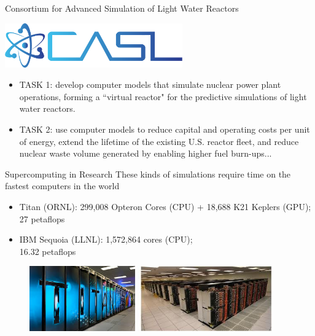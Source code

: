 \documentclass[xcolor=x11names,compress]{beamer}
\renewcommand{\(}{\begin{columns}}
\renewcommand{\)}{\end{columns}}
\newcommand{\<}[1]{\begin{column}{#1}}
\renewcommand{\>}{\end{column}}
\begin{document}
\begin{frame}{Consortium for Advanced Simulation of Light Water Reactors}
\begin{center}
\includegraphics[height=0.75in,clip]{CASL}
\end{center}
\begin{itemize}
\item \textcolor{RawSienna}{TASK 1}: develop computer models that simulate nuclear power plant operations, forming a ``virtual reactor" for the predictive simulations of light water reactors. 
\item \textcolor{RawSienna}{TASK 2}: use computer models to reduce capital and operating costs per unit of energy, extend the lifetime of the existing U.S. reactor fleet, and reduce nuclear waste volume generated by enabling higher fuel burn-ups... %
\end{itemize}
\end{frame}

\begin{frame}{Supercomputing in Research}
These kinds of simulations require time on the fastest computers in the world
\begin{itemize}
\item \textcolor{RawSienna}{Titan} (ORNL): 299,008 Opteron Cores (CPU) + 18,688 K21 Keplers (GPU); 27 petaflops 
\item \textcolor{RawSienna}{IBM Sequoia} (LLNL): 1,572,864 cores (CPU); \\16.32 petaflops
\end{itemize}
\begin{figure}
\includegraphics[height=1.1in,clip]{Titan}
\hfill
\includegraphics[height=1.1in,clip]{Sequoia}
\end{figure}
\end{frame}
\end{document}
